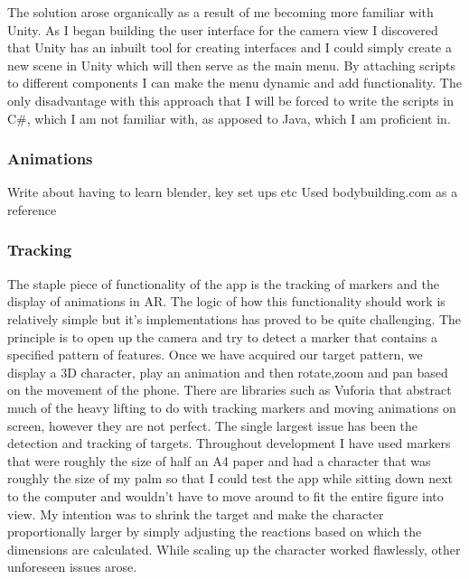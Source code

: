 \documentclass{l4proj}
\begin{document}
The solution arose organically as a result of me becoming more familiar with Unity. As I began building the user interface for the camera view I discovered that Unity has an inbuilt tool for creating interfaces and I could simply create a new scene in Unity which will then serve as the main menu. By attaching scripts to different components I can make the menu dynamic and add functionality. The only disadvantage with this approach that I will be forced to write the scripts in C\#, which I am not familiar with, as apposed to Java, which I am proficient in. 

\subsubsection{Animations}
Write about having to learn blender, key set ups etc
Used bodybuilding.com as a reference 

\subsubsection{Tracking}
The staple piece of functionality of the app is the tracking of markers and the display of animations in AR. The logic of how this functionality should work is relatively simple but it's implementations has proved to be quite challenging. The principle is to open up the camera and try to detect a marker that contains a specified pattern of features. Once we have acquired our target pattern, we display a 3D character, play an animation and then rotate,zoom and pan based on the movement of the phone. There are libraries such as Vuforia that abstract much of the heavy lifting to do with tracking markers and moving animations on screen, however they are not perfect. The single largest issue has been the detection and tracking of targets. Throughout development I have used markers that were roughly the size of half an A4 paper and had a character that was roughly the size of my palm so that I could test the app while sitting down next to the computer and wouldn't have to move around to fit the entire figure into view. My intention was to shrink the target and make the character proportionally larger by simply adjusting the reactions based on which the dimensions are calculated. While scaling up the character worked flawlessly, other unforeseen issues arose.
\end{document}
